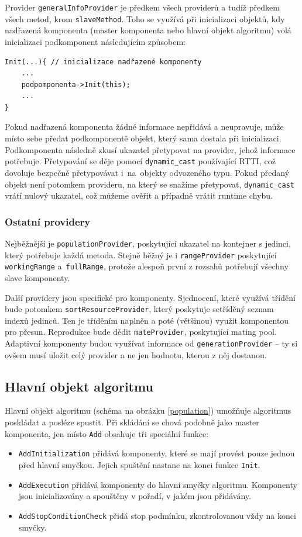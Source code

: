 Provider \texttt{generalInfoProvider} je předkem všech providerů a tudíž předkem všech metod, krom \texttt{slaveMethod}. Toho se využívá při inicializaci objektů, kdy nadřazená komponenta (master komponenta nebo hlavní objekt algoritmu) volá inicializaci podkomponent následujícím způsobem:
\begin{verbatim}
Init(...){ // inicializace nadřazené komponenty
    ...
    podpomponenta->Init(this);
    ...
}
\end{verbatim}
Pokud nadřazená komponenta žádné informace nepřidává a neupravuje, může místo sebe předat podkomponentě objekt, který sama dostala při inicializaci. Podkomponenta následně zkusí ukazatel přetypovat na provider, jehož informace potřebuje. Přetypování se děje pomocí \texttt{dynamic\_cast} používající RTTI, což dovoluje bezpečně přetypovávat i~na~objekty odvozeného typu. Pokud předaný objekt není potomkem provideru, na který se snažíme přetypovat, \texttt{dynamic\_cast} vrátí nulový ukazatel, což můžeme ověřit a případně vrátit runtime chybu.

\subsubsection{Ostatní providery}

Nejběžnější je \texttt{populationProvider}, poskytující ukazatel na kontejner s jedinci, který potřebuje každá metoda. Stejně běžný je i \texttt{rangeProvider} poskytující \texttt{workingRange} a~\texttt{fullRange}, protože alespoň první z rozsahů potřebují všechny slave komponenty.

Další providery jsou specifické pro komponenty. Sjednocení, které využívá třídění bude potomkem \texttt{sortResourceProvider}, který poskytuje setříděný seznam indexů jedinců. Ten je tříděním naplněn a poté (většinou) využit komponentou pro přesun. Reprodukce bude dědit \texttt{mateProvider}, poskytující mating pool. Adaptivní komponenty budou využívat informace od \texttt{generationProvider} -- ty si ovšem musí uložit celý provider a ne jen hodnotu, kterou z něj dostanou.

\subsection{Hlavní objekt algoritmu}

Hlavní objekt algoritmu (schéma na obrázku \ref{population}) umožňuje algoritmus poskládat a posléze spustit. Při skládání se chová podobně jako master komponenta, jen místo \texttt{Add} obsahuje tři speciální funkce:
\begin{itemize}
  \item \texttt{AddInitialization} přidává komponenty, které se mají provést pouze jednou před hlavní smyčkou. Jejich spuštění nastane na konci funkce \texttt{Init}.
  \item \texttt{AddExecution} přidává komponenty do hlavní smyčky algoritmu. Komponenty jsou inicializovány a spouštěny v pořadí, v jakém jsou přidávány.
  \item \texttt{AddStopConditionCheck} přidá stop podmínku, zkontrolovanou vždy na konci smyčky.
\end{itemize}

